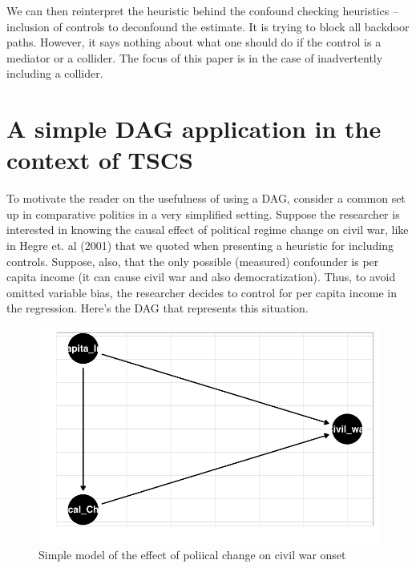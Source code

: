 \documentclass[
  super,
  preprint,
  3p]{elsarticle}
\begin{document}
We can then reinterpret the heuristic behind the confound checking
heuristics -- inclusion of controls to deconfound the estimate. It is
trying to block all backdoor paths. However, it says nothing about what
one should do if the control is a mediator or a collider. The focus of
this paper is in the case of inadvertently including a collider.

\hypertarget{a-simple-dag-application-in-the-context-of-tscs}{%
\section{A simple DAG application in the context of
TSCS}\label{a-simple-dag-application-in-the-context-of-tscs}}

To motivate the reader on the usefulness of using a DAG, consider a
common set up in comparative politics in a very simplified setting.
Suppose the researcher is interested in knowing the causal effect of
political regime change on civil war, like in Hegre et. al (2001) that
we quoted when presenting a heuristic for including controls. Suppose,
also, that the only possible (measured) confounder is per capita income
(it can cause civil war and also democratization). Thus, to avoid
omitted variable bias, the researcher decides to control for per capita
income in the regression. Here's the DAG that represents this situation.

\begin{figure}

{\centering \includegraphics{Papers_beware_collider_files/figure-pdf/fig-dag-model-basic-1.pdf}

}

\caption{\label{fig-dag-model-basic}Simple model of the effect of
poliical change on civil war onset}

\end{figure}
\end{document}
